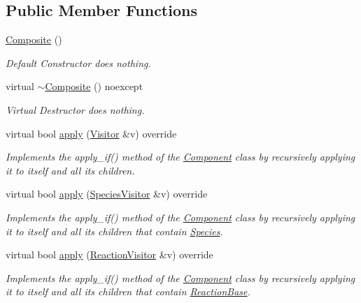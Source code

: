 \subsection*{Public Member Functions}
\begin{DoxyCompactItemize}
\item 
\hyperlink{classComposite_ad28832d957183a7f08dec72e6040db0a}{Composite} ()
\begin{DoxyCompactList}\small\item\em Default Constructor does nothing. \end{DoxyCompactList}\item 
virtual \hyperlink{classComposite_aff9a67fcee895f61ba381664e980e461}{$\sim$\+Composite} () noexcept
\begin{DoxyCompactList}\small\item\em Virtual Destructor does nothing. \end{DoxyCompactList}\item 
virtual bool \hyperlink{classComposite_a58123ab346f6621a187bebe456e383ea}{apply} (\hyperlink{classVisitor}{Visitor} \&v) override
\begin{DoxyCompactList}\small\item\em Implements the apply\+\_\+if() method of the \hyperlink{classComponent}{Component} class by recursively applying it to itself and all its children. \end{DoxyCompactList}\item 
virtual bool \hyperlink{classComposite_a18937a1f6f84a159e77ba83dd34b2e20}{apply} (\hyperlink{classSpeciesVisitor}{Species\+Visitor} \&v) override
\begin{DoxyCompactList}\small\item\em Implements the apply\+\_\+if() method of the \hyperlink{classComponent}{Component} class by recursively applying it to itself and all its children that contain \hyperlink{classSpecies}{Species}. \end{DoxyCompactList}\item 
virtual bool \hyperlink{classComposite_aa4a608ee92aaaa6e0d63278595707474}{apply} (\hyperlink{classReactionVisitor}{Reaction\+Visitor} \&v) override
\begin{DoxyCompactList}\small\item\em Implements the apply\+\_\+if() method of the \hyperlink{classComponent}{Component} class by recursively applying it to itself and all its children that contain \hyperlink{classReactionBase}{Reaction\+Base}. \end{DoxyCompactList}\item 

\end{DoxyCompactItemize}
